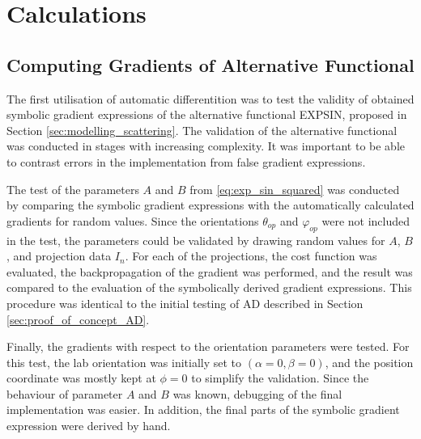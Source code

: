 
\chapter{Calculations}

\section{Computing Gradients of Alternative Functional}\label{sec:calc_alt_functional} %

The first utilisation of automatic differentition was to test the validity of obtained symbolic gradient expressions of the alternative functional EXPSIN, proposed in Section \ref{sec:modelling_scattering}.
The validation of the alternative functional was conducted in stages with increasing complexity.
It was important to be able to contrast errors in the implementation from false gradient expressions.


The test of the parameters $A$ and $B$ from \eqref{eq:exp_sin_squared} was conducted by comparing the symbolic gradient expressions with the automatically calculated gradients for random values.
Since the orientations $\theta_{op}$ and $\varphi_{op}$ were not included in the test, the parameters could be validated by drawing random values for $A$, $B$,
and projection data $I_{n}$.
For each of the projections, the cost function was evaluated, the backpropagation of the gradient was performed, and the result was compared to the evaluation of the symbolically derived gradient expressions.
This procedure was identical to the initial testing of AD described in Section \ref{sec:proof_of_concept_AD}.

Finally, the gradients with respect to the orientation parameters were tested.
For this test, the lab orientation was initially set to $\left( \alpha = 0, \beta = 0 \right)$, and the position coordinate was mostly kept at $\phi = 0$ to simplify the validation.
Since the behaviour of parameter $A$ and $B$ was known, debugging of the final implementation was easier. %
In addition, the final parts of the symbolic gradient expression were derived by hand.


